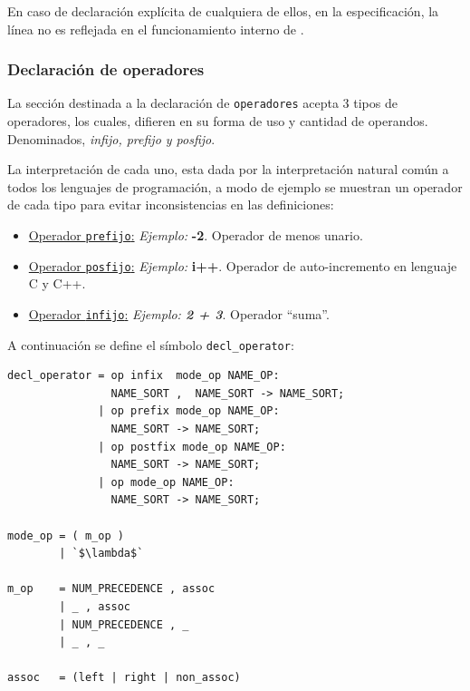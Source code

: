 En caso de declaración explícita de cualquiera de ellos, en la especificación, la línea no es reflejada en el funcionamiento interno de \maggen.

\subsubsection{Declaración de operadores}
La sección destinada a la declaración de \texttt{operadores} acepta 3 tipos de operadores, los cuales, difieren en su forma de uso y cantidad de operandos. Denominados, \textit{infijo, prefijo y posfijo}. 

La interpretación de cada uno, esta dada por la interpretación natural común a todos los lenguajes de programación, a modo de ejemplo se muestran un operador de cada tipo para evitar inconsistencias en las definiciones:

\begin{itemize}
\item \underline{Operador \texttt{prefijo}:} \textit{Ejemplo:} \textbf{-2}. Operador de menos unario. 

\item \underline{Operador \texttt{posfijo}:} \textit{Ejemplo:} \textbf{i++}. Operador de auto-incremento en lenguaje C y C++.

\item \underline{Operador \texttt{infijo}:} \textit{Ejemplo: \textbf{2 + 3}}. Operador ``suma''.
\end{itemize}

A continuación se define el símbolo \texttt{decl\_operator}:

\vspace{0.3cm}
\begin{lstlisting}[frame=shadowbox, rulesepcolor=\color{azul}, language=specmag ]
decl_operator = op infix  mode_op NAME_OP:
                NAME_SORT ,  NAME_SORT -> NAME_SORT;
              | op prefix mode_op NAME_OP:
                NAME_SORT -> NAME_SORT;
              | op postfix mode_op NAME_OP:
                NAME_SORT -> NAME_SORT;
              | op mode_op NAME_OP:
                NAME_SORT -> NAME_SORT;

mode_op = ( m_op )
        | `$\lambda$`

m_op    = NUM_PRECEDENCE , assoc
        | _ , assoc
        | NUM_PRECEDENCE , _
        | _ , _

assoc   = (left | right | non_assoc)
\end{lstlisting}
\vspace{0.3cm}

